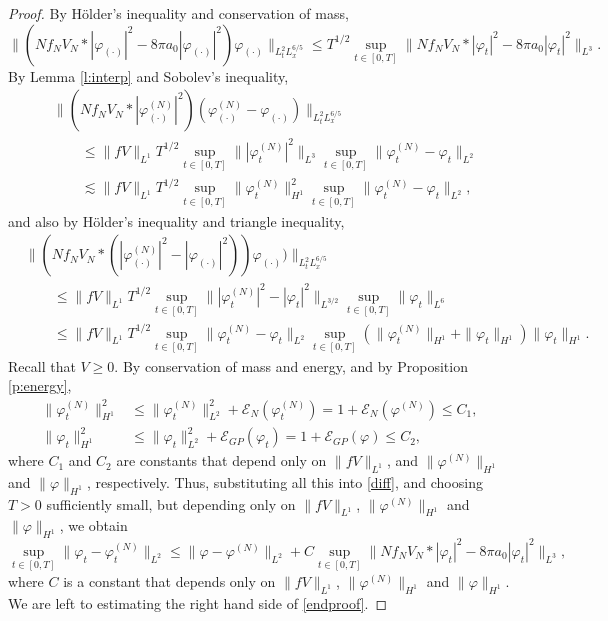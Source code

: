 \documentclass[11pt,a4paper]{scrartcl} %
\begin{document}
\begin{proof}
  By H\"older's inequality and conservation of mass,
  \begin{displaymath}
    \| (N f_N V_N * |\varphi_{(\cdot)}|^2 - 8 \pi a_0 |\varphi_{(\cdot)}|^2)
    \varphi_{(\cdot)} \|_{L_t^2 L_x^{6/5}} \le T^{1/2} \sup_{t \in [0,T]} \| N
    f_N V_N * |\varphi_t|^2 - 8 \pi a_0 |\varphi_t|^2 \|_{L^3}.
  \end{displaymath}
  By Lemma \ref{l:interp} and Sobolev's inequality,
  \begin{align*}
    & \| (N f_N V_N * |\varphi_{(\cdot)}^{(N)}|^2)(\varphi_{(\cdot)}^{(N)} -
    \varphi_{(\cdot)}) \|_{L_t^2 L_x^{6/5}} \\
    & \qquad \le \| fV \|_{L^1} T^{1/2} \sup_{t \in [0,T]} \|
    |\varphi_t^{(N)}|^2 \|_{L^3} \sup_{t \in [0,T]} \| \varphi_t^{(N)} -
    \varphi_t \|_{L^2} \\
    & \qquad \apprle \| fV \|_{L^1} T^{1/2} \sup_{t \in [0,T]} \|
    \varphi_t^{(N)} \|_{H^1}^2 \sup_{t \in [0,T]} \| \varphi_t^{(N)} -
    \varphi_t \|_{L^2},
  \end{align*}
  and also by H\"older's inequality and triangle inequality,
  \begin{align*}
    & \| (N f_N V_N * (|\varphi_{(\cdot)}^{(N)}|^2 - |\varphi_{(\cdot)}|^2))
    \varphi_{(\cdot)}) \|_{L_t^2 L_x^{6/5}} \\
    & \qquad \le \| fV \|_{L^1} T^{1/2} \sup_{t \in [0,T]} \|
    |\varphi_t^{(N)}|^2 - |\varphi_t|^2 \|_{L^{3/2}} \sup_{t \in [0,T]} \|
    \varphi_t \|_{L^6} \\
    & \qquad \le \| fV \|_{L^1} T^{1/2} \sup_{t \in [0,T]} \|
    \varphi_t^{(N)} - \varphi_t \|_{L^2} \sup_{t \in [0,T]} (\|
    \varphi_t^{(N)} \|_{H^1} + \| \varphi_t \|_{H^1}) \| \varphi_t \|_{H^1}.
  \end{align*}
  Recall that $V \ge 0$. By conservation of mass and energy, and by
  Proposition \ref{p:energy},
  \begin{align*}
    \| \varphi_t^{(N)} \|_{H^1}^2 & \le \| \varphi_t^{(N)} \|_{L^2}^2 +
    \mathcal{E}_N(\varphi_t^{(N)}) = 1 + \mathcal{E}_N(\varphi^{(N)}) \le C_1,
    \\
    \| \varphi_t \|_{H^1}^2 & \le \| \varphi_t \|_{L^2}^2 +
    \mathcal{E}_{GP}(\varphi_t) = 1 + \mathcal{E}_{GP}(\varphi) \le C_2,
  \end{align*}
  where $C_1$ and $C_2$ are constants that depend only on $\| fV \|_{L^1}$,
  and $\| \varphi^{(N)} \|_{H^1}$ and $\| \varphi \|_{H^1}$, respectively.
  Thus, substituting all this into \eqref{diff}, and choosing $T > 0$
  sufficiently small, but depending only on $\| fV \|_{L^1}$, $\|
  \varphi^{(N)} \|_{H^1}$ and $\| \varphi \|_{H^1}$, we obtain
  \begin{equation}
    \sup_{t \in [0,T]} \| \varphi_t - \varphi_t^{(N)} \|_{L^2} \le \| \varphi
    - \varphi^{(N)} \|_{L^2} + C \sup_{t \in [0,T]} \| N f_N V_N *
    |\varphi_t|^2 - 8 \pi a_0 |\varphi_t|^2 \|_{L^3},
    \label{endproof}
  \end{equation}
  where $C$ is a constant that depends only on $\| fV \|_{L^1}$, $\|
  \varphi^{(N)} \|_{H^1}$ and $\| \varphi \|_{H^1}$. We are left to estimating
  the right hand side of \eqref{endproof}.



\end{proof}
\end{document}
